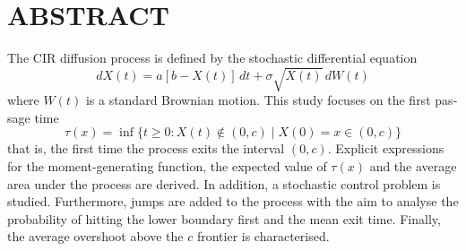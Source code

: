 
\chapter*{ABSTRACT}\thispagestyle{headings}
%
\begin{otherlanguage}{english}

The \ac{CIR} diffusion process is defined by the stochastic differential equation
\[
dX(t) = a[b - X(t)]\,dt + \sigma \sqrt{X(t)}\,dW(t)
\]
where \(W(t)\) is a standard Brownian motion. This study focuses on the first passage time
\[
\tau(x) = \inf\{ t \geq 0 : X(t) \notin (0, c) \mid X(0) = x \in (0, c) \}
\]
that is, the first time the process exits the interval \((0, c)\). Explicit expressions for the moment-generating function, the expected value of \(\tau(x)\) and the average area under the process are derived. In addition, a stochastic control problem is studied. Furthermore, jumps are added to the process with the aim to analyse the probability of hitting the lower boundary first and the mean exit time. Finally, the average overshoot above the $c$ frontier is characterised.


\end{otherlanguage}
